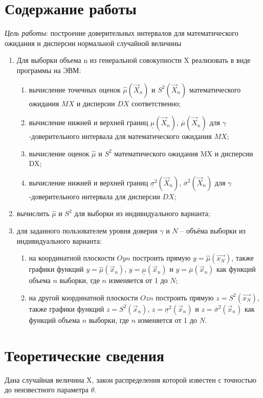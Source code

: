 \chapter{Содержание работы}
\textit{Цель работы}:  построение доверительных интервалов для математического ожидания и дисперсии нормальной случайной величины
\begin{enumerate}[wide=0pt]
	\item Для выборки объема n из генеральной совокупности X реализовать в виде программы на ЭВМ:
	\begin{enumerate}
		\item вычисление точечных оценок $\hat\mu(\vec X_n)$ и $S^2(\vec X_n)$ математического ожидания $MX$ и дисперсии $DX$ соответственно;
		\item вычисление нижней и верхней границ $\underline\mu(\vec X_n)$, $\overline\mu(\vec X_n)$ для $\gamma$-доверительного интервала для математического ожидания $MX$;
		\item вычисление оценок $\hat{\mu}$ и $S^2$ математического ожидания MX и дисперсии DX;
		\item вычисление нижней и верхней границ $\underline\sigma^2(\vec X_n)$, $\overline\sigma^2(\vec X_n)$ для $\gamma$-доверительного интервала для дисперсии $DX$;
	\end{enumerate}
	\item вычислить $\hat\mu$ и $S^2$ для выборки из индивидуального варианта;
	\item для заданного пользователем уровня доверия $\gamma$ и $N$ – объёма выборки из индивидуального варианта:
	\begin{enumerate}
		\item на координатной плоскости $Oyn$ построить прямую $y = \hat\mu(\vec{x_N})$, также графики функций $y = \hat\mu(\vec x_n)$, $y = \underline\mu(\vec x_n)$ и $y = \overline\mu(\vec x_n)$ как функций объема $n$ выборки, где $n$ изменяется от 1 до $N$;
		\item на другой координатной плоскости $Ozn$ построить прямую $z = S^2(\vec{x_N})$, также графики функций $z = S^2(\vec x_n)$, $z = \underline\sigma^2(\vec x_n)$ и $z = \overline\sigma^2(\vec x_n)$ как функций объема $n$ выборки, где $n$ изменяется от 1 до $N$.
	\end{enumerate}
\end{enumerate}

\chapter{Теоретические сведения}
Дана случайная величина X, закон распределения которой известен с точностью до неизвестного параметра $\theta$. 

